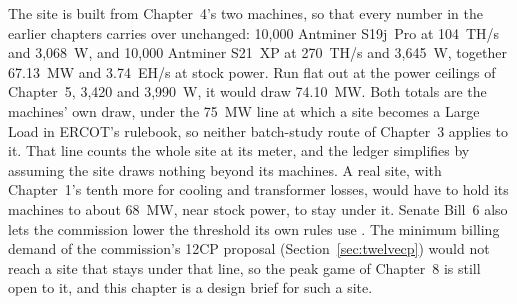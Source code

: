 The site is built from Chapter~4's two machines, so that every number in the earlier chapters carries over unchanged: 10,000 Antminer S19j~Pro at 104~TH/s and 3,068~W, and 10,000 Antminer S21~XP at 270~TH/s and 3,645~W, together 67.13~MW and 3.74~EH/s at stock power. %
Run flat out at the power ceilings of Chapter~5, 3,420 and 3,990~W, it would draw 74.10~MW. Both totals are the machines' own draw, under the 75~MW line at which a site becomes a Large Load in ERCOT's rulebook, so neither batch-study route of Chapter~3 applies to it. That line counts the whole site at its meter, and the ledger simplifies by assuming the site draws nothing beyond its machines. A real site, with Chapter~1's tenth more for cooling and transformer losses, would have to hold its machines to about 68~MW, near stock power, to stay under it. Senate Bill~6 also lets the commission lower the threshold its own rules use \autocite{texas2025sb6}. The minimum billing demand of the commission's 12CP proposal (Section~\ref{sec:twelvecp}) would not reach a site that stays under that line, so the peak game of Chapter~8 is still open to it, and this chapter is a design brief for such a site. %